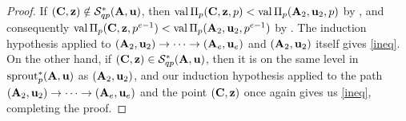 \documentclass{article}
\begin{document}
\begin{proof}
   If $(\mathbf{C},\mathbf{z}) \notin \mathcal{S}^{\ast}_{qp}(\mathbf{A},\mathbf{u})$, then $\operatorname{val} \Pi_p(\mathbf{C},\mathbf{z}, p)< \operatorname{val} \Pi_p(\mathbf{A}_2, \mathbf{u}_2, p)$ by , and consequently $\operatorname{val} \Pi_p(\mathbf{C}, \mathbf{z},p^{e-1}) < \operatorname{val}\Pi_p(\mathbf{A}_2,\mathbf{u}_2, p^{e-1})$ by .
   The induction hypothesis applied to $(\mathbf{A}_2, \mathbf{u}_2) \to \cdots \to (\mathbf{A}_e, \mathbf{u}_e)$ and $(\mathbf{A}_2,\mathbf{u}_2)$ itself gives \eqref{ineq}.
   On the other hand, if $(\mathbf{C}, \mathbf{z}) \in \mathcal{S}^{\ast}_{qp}(\mathbf{A},\mathbf{u})$, then it is on the same level in $\operatorname{sprout}_p^{\ast}(\mathbf{A},\mathbf{u})$ as $(\mathbf{A}_2, \mathbf{u}_2)$, and  our induction hypothesis applied to the path $(\mathbf{A}_2, \mathbf{u}_2) \to \cdots \to (\mathbf{A}_e, \mathbf{u}_e)$ and the point $(\mathbf{C}, \mathbf{z})$ once again gives us \eqref{ineq}, completing the proof.
\end{proof}

\end{document}
